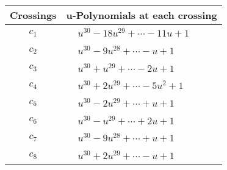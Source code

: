 \documentclass[1p]{elsarticle_modified}
\theoremstyle{definition}
\begin{document}
\begin{tabular}{m{50pt}|m{274pt}}
Crossings & \hspace{64pt}u-Polynomials at each crossing \\
\hline $$\begin{aligned}c_{1}\end{aligned}$$&$\begin{aligned}
&u^{30}-18 u^{29}+\cdots-11 u+1
\end{aligned}$\\
\hline $$\begin{aligned}c_{2}\end{aligned}$$&$\begin{aligned}
&u^{30}-9 u^{28}+\cdots- u+1
\end{aligned}$\\
\hline $$\begin{aligned}c_{3}\end{aligned}$$&$\begin{aligned}
&u^{30}+u^{29}+\cdots-2 u+1
\end{aligned}$\\
\hline $$\begin{aligned}c_{4}\end{aligned}$$&$\begin{aligned}
&u^{30}+2 u^{29}+\cdots-5 u^2+1
\end{aligned}$\\
\hline $$\begin{aligned}c_{5}\end{aligned}$$&$\begin{aligned}
&u^{30}-2 u^{29}+\cdots+u+1
\end{aligned}$\\
\hline $$\begin{aligned}c_{6}\end{aligned}$$&$\begin{aligned}
&u^{30}- u^{29}+\cdots+2 u+1
\end{aligned}$\\
\hline $$\begin{aligned}c_{7}\end{aligned}$$&$\begin{aligned}
&u^{30}-9 u^{28}+\cdots+u+1
\end{aligned}$\\
\hline $$\begin{aligned}c_{8}\end{aligned}$$&$\begin{aligned}
&u^{30}+2 u^{29}+\cdots- u+1
\end{aligned}$\\

\end{tabular}
\end{document}
